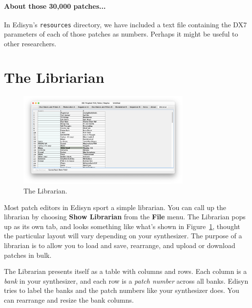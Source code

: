 \documentclass{article}
\begin{document}
\paragraph{About those 30,000 patches...} In Edisyn's \texttt{resources} directory, we have included a text file containing the DX7 parameters of each of those patches as numbers. Perhaps it might be useful to other researchers. 

\section{The Libriarian}
\label{librarian}

\begin{figure}
\vspace{-2em}\includegraphics[width=3.4in]{Librarian.png}
\vspace{-3em}
\caption{The Librarian.}
\vspace{-1em}
\label{librarianpanel}
\end{figure}


Most patch editors in Edisyn sport a simple librarian.  You can call up the librarian by choosing {\bf Show Librarian} from the {\bf File} menu.  The Librarian pops up as its own tab, and looks something like what's shown in Figure~\ref{librarianpanel}, thought the particular layout will vary depending on your synthesizer. The purpose of a librarian is to allow you to load and save, rearrange, and upload or download patches in bulk.  %

The Librarian presents itself as a table with columns and rows.  Each column is a {\it bank} in your synthesizer, and each row is a {\it patch number} across all banks.  Edisyn tries to label the banks and the patch numbers like your synthesizer does.  You can rearrange and resize the bank columns.  
\end{document}
